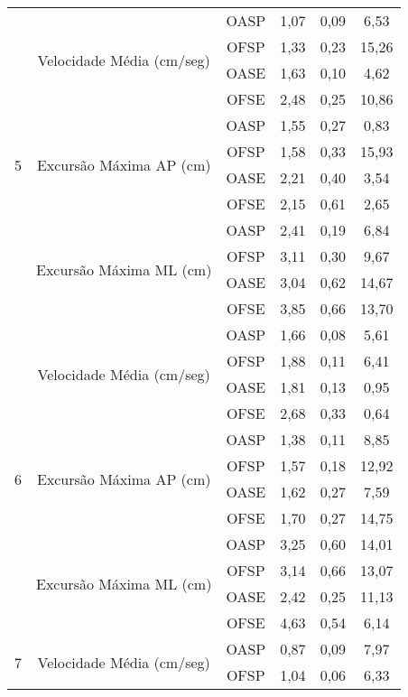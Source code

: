 \begin{apendicesenv}
\begin{table}[ht]
\begin{tabular}{|c|c|c|c|c|c|}
\multirow{12}{*}{5} & \multirow{4}{*}{Velocidade Média (cm/seg)} & OASP & 1,07 & 0,09 & 6,53 \\ \cline{3-6} 
 &  & OFSP & 1,33 & 0,23 & 15,26 \\ \cline{3-6} 
 &  & OASE & 1,63 & 0,10 & 4,62 \\ \cline{3-6} 
 &  & OFSE & 2,48 & 0,25 & 10,86 \\ \cline{2-6} 
 & \multirow{4}{*}{Excursão Máxima AP (cm)} & OASP & 1,55 & 0,27 & 0,83 \\ \cline{3-6} 
 &  & OFSP & 1,58 & 0,33 & 15,93 \\ \cline{3-6} 
 &  & OASE & 2,21 & 0,40 & 3,54 \\ \cline{3-6} 
 &  & OFSE & 2,15 & 0,61 & 2,65 \\ \cline{2-6} 
 & \multirow{4}{*}{Excursão Máxima ML (cm)} & OASP & 2,41 & 0,19 & 6,84 \\ \cline{3-6} 
 &  & OFSP & 3,11 & 0,30 & 9,67 \\ \cline{3-6} 
 &  & OASE & 3,04 & 0,62 & 14,67 \\ \cline{3-6} 
 &  & OFSE & 3,85 & 0,66 & 13,70 \\ \hline
\multirow{12}{*}{6} & \multirow{4}{*}{Velocidade Média (cm/seg)} & OASP & 1,66 & 0,08 & 5,61 \\ \cline{3-6} 
 &  & OFSP & 1,88 & 0,11 & 6,41 \\ \cline{3-6} 
 &  & OASE & 1,81 & 0,13 & 0,95 \\ \cline{3-6} 
 &  & OFSE & 2,68 & 0,33 & 0,64 \\ \cline{2-6} 
 & \multirow{4}{*}{Excursão Máxima AP (cm)} & OASP & 1,38 & 0,11 & 8,85 \\ \cline{3-6} 
 &  & OFSP & 1,57 & 0,18 & 12,92 \\ \cline{3-6} 
 &  & OASE & 1,62 & 0,27 & 7,59 \\ \cline{3-6} 
 &  & OFSE & 1,70 & 0,27 & 14,75 \\ \cline{2-6} 
 & \multirow{4}{*}{Excursão Máxima ML (cm)} & OASP & 3,25 & 0,60 & 14,01 \\ \cline{3-6} 
 &  & OFSP & 3,14 & 0,66 & 13,07 \\ \cline{3-6} 
 &  & OASE & 2,42 & 0,25 & 11,13 \\ \cline{3-6} 
 &  & OFSE & 4,63 & 0,54 & 6,14 \\ \hline
\multirow{12}{*}{7} & \multirow{4}{*}{Velocidade Média (cm/seg)} & OASP & 0,87 & 0,09 & 7,97 \\ \cline{3-6} 
 &  & OFSP & 1,04 & 0,06 & 6,33 \\ \cline{3-6} 

\end{tabular}
\end{table}
\end{apendicesenv}
